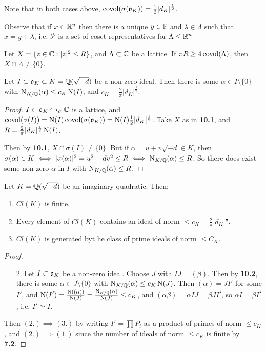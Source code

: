 \documentclass[10pt,a4paper]{article}
\begin{document}
Note that in both cases above, $\covol(\sigma(\o_K)) = \frac12|d_K|^{\frac12}$.

Observe that if $x \in \R^n$ then there is a unique $y \in \P$ and $\lambda \in \Lambda$ such that $x = y +\lambda$, i.e. $\mathcal{P}$ is a set of coset representatives for $\Lambda \leq \R^n$

\begin{theorem}
Let $X = \{z \in \C : |z|^2 \leq R\}$, and $\Lambda \subset \C$ be a lattice. If $\pi R \geq 4 \covol(\Lambda)$, then $X \cap \Lambda \neq \{0\}$.
\end{theorem}
\begin{theorem}
Let $I \subset \o_K \subset K = \Q(\sqrt{-d})$ be a non-zero ideal. Then there is some $\alpha \in I\setminus\{0\}$ with $\Nn_{K/\Q}(\alpha)\leq c_K \Nn(I)$, and $c_K = \frac{2}{\pi}|d_K|^{\frac12}$.
\end{theorem}
\begin{proof}
$I \subset \o_K \injection_\sigma \C$ is a lattice, and $\covol(\sigma(I)) = \Nn(I)\covol(\sigma(\o_K)) = \Nn(I)\frac{1}{2}|d_K|^{\frac12}$. Take $X$ as in \textbf{10.1}, and $R = \frac{2}{\pi}|d_K|^{\frac12}\Nn(I)$.

Then by \textbf{10.1}, $X \cap \sigma(I) \neq \{0\}$. But if $\alpha = u +v\sqrt{-d} \in K$, then $\sigma(\alpha) \in K \iff |\sigma(\alpha)|^2 = u^2+dv^2 \leq R \iff \Nn_{K/\Q}(\alpha) \leq R$. So there does exist some non-zero $\alpha$ in $I$ with $\Nn_{K/\Q}(\alpha) \leq R$.
\end{proof}

\begin{corollary}
Let $K = \Q(\sqrt{-d})$ be an imaginary quadratic. Then:
\begin{enumerate}
\item $Cl(K)$ is finite.
\item Every element of $Cl(K)$ contains an ideal of norm $\leq c_K = \frac{2}{\pi}|d_K|^{\frac12}$.
\item $Cl(K)$ is generated byt he class of prime ideals of norm $\leq C_K$.
\end{enumerate}
\end{corollary}
\begin{proof}
\begin{itemize}
\item[2.] Let $I \subset \o_K$ be a non-zero ideal. Choose $J$ with $IJ = (\beta)$. Then by \textbf{10.2}, there is some $\alpha \in J \setminus \{0\}$ with $\Nn_{K/\Q}(\alpha) \leq c_K \Nn(J)$. Then $(\alpha) = JI'$ for some $I'$, and $\Nn(I') = \frac{\Nn((\alpha))}{\Nn(J)} = \frac{\Nn_{K/\Q}(\alpha)}{\Nn(J)} \leq c_K$, and $(\alpha\beta) = \alpha IJ = \beta JI'$, so $\alpha I = \beta I'$, i.e. $I' \simeq I$.
\end{itemize}
Then $(2.)\implies(3.)$ by writing $I' = \prod P_i$ as a product of primes of norm $\leq c_K$, and $(2.)\implies(1.)$ since the number of ideals of norm $\leq c_K$ is finite by \textbf{7.2}.
\end{proof}
\end{document}

